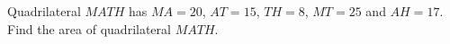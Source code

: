 Quadrilateral $MATH$ has $MA=20$, $AT=15$, $TH=8$, $MT=25$ and $AH=17$. Find the area of quadrilateral $MATH$.
